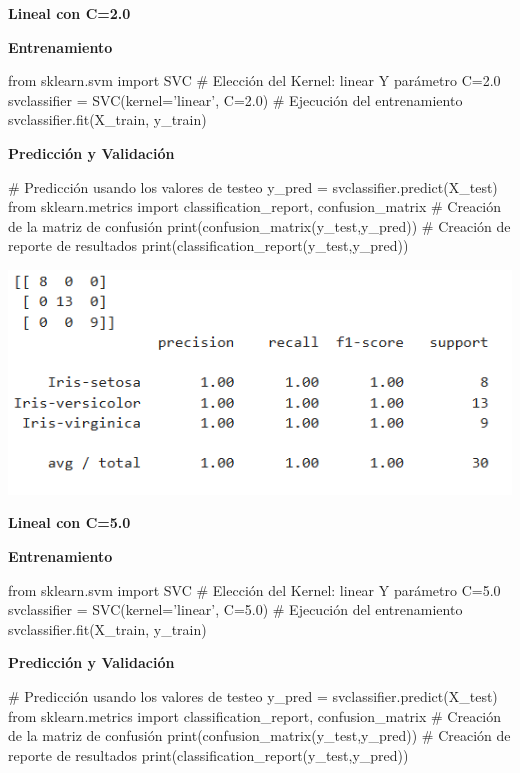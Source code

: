 \documentclass[paper=a4, fontsize=11pt]{scrartcl}
\numberwithin{equation}{section}		%
\numberwithin{figure}{section}			%
\numberwithin{table}{section}				%
\begin{document}
    \textbf{Lineal con C=2.0}
    
    \textbf{Entrenamiento}
    
    \begin{python}
    from sklearn.svm import SVC
    # Elección del Kernel: linear Y parámetro C=2.0
    svclassifier = SVC(kernel='linear', C=2.0)
    # Ejecución del entrenamiento
    svclassifier.fit(X_train, y_train)
    \end{python}
    
    \textbf{Predicción y Validación}
    
    \begin{python}
    # Predicción usando los valores de testeo
    y_pred = svclassifier.predict(X_test)
    from sklearn.metrics import classification_report, confusion_matrix
    # Creación de la matriz de confusión
    print(confusion_matrix(y_test,y_pred))
    # Creación de reporte de resultados
    print(classification_report(y_test,y_pred))
    \end{python}
    
    \includegraphics[scale=0.8]{lineal_c_20}
    \newpage
    
    \textbf{Lineal con C=5.0}
    
    \textbf{Entrenamiento}
    
    \begin{python}
    from sklearn.svm import SVC
    # Elección del Kernel: linear Y parámetro C=5.0
    svclassifier = SVC(kernel='linear', C=5.0)
    # Ejecución del entrenamiento
    svclassifier.fit(X_train, y_train)
    \end{python}
    
    \textbf{Predicción y Validación}
    
    \begin{python}
    # Predicción usando los valores de testeo
    y_pred = svclassifier.predict(X_test)
    from sklearn.metrics import classification_report, confusion_matrix
    # Creación de la matriz de confusión
    print(confusion_matrix(y_test,y_pred))
    # Creación de reporte de resultados
    print(classification_report(y_test,y_pred))
    \end{python}
    
\end{document}
